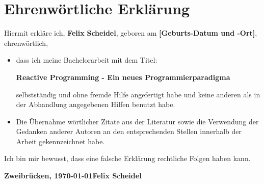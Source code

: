 \chapter*{Ehrenw\"ortliche Erkl\"arung}
Hiermit erkl\"are ich, \textbf{Felix} \textbf{Scheidel}, geboren am
\textbf{[Geburts-Datum und -Ort]}, ehrenw\"ortlich,
\begin{itemize}
\item dass ich meine Bachelorarbeit mit dem Titel:

\textbf{Reactive Programming - Ein neues Programmierparadigma}

selbstst\"andig und ohne fremde Hilfe angefertigt habe und keine anderen als in der
Abhandlung angegebenen Hilfen benutzt habe.
\item Die \"Ubernahme w\"ortlicher Zitate aus der Literatur
sowie die Verwendung der Gedanken anderer Autoren an den entsprechenden
Stellen innerhalb der Arbeit gekennzeichnet habe.
\end{itemize}
Ich bin mir bewusst, dass eine falsche Erkl\"arung rechtliche Folgen haben kann.
\vspace*{3cm}

\textbf{Zweibr\"ucken, \today}\hfill\textbf{Felix Scheidel}
